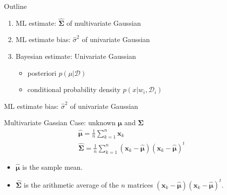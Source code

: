 \documentclass[compress,blue]{beamer}
\newcommand{\bx}{\mathbf{x}}
\newcommand{\bmu}{\mathbf{\mu}}
\newcommand{\bSig}{\mathbf{\Sigma}}
\newcommand{\calD}{\mathcal{D}}
\begin{document}
\begin{frame}{Outline}
	\begin{enumerate}
		\item<1-> ML estimate: $\hat{\bSig}$ of multivariate Gaussian 
		\vspace{0.1in}
		\item<2-> ML estimate bias: $\hat{\sigma}^2$ of univariate Gaussian
		\vspace{0.1in}
		\item<0> Bayesian estimate: Univariate Gaussian
		\begin{itemize}
			\item posteriori $p(\mu|\calD)$
			\item conditional probability density $p(x | w_i, \calD_i)$
		\end{itemize}
	\end{enumerate}
\end{frame}

\begin{frame}{ML estimate bias: $\hat{\sigma}^2$ of univariate Gaussian}
	\begin{block}{Multivariate Gassian Case: unknown $\bmu$ and $\bSig$}
		\begin{align}
			&\hat{\bmu} = \frac{1}{n}\sum_{k=1}^n\bx_k\\
			&\hat{\bSig} = \frac{1}{n}\sum_{k=1}^n(\bx_k - \hat{\bmu})(\bx_k - \hat{\bmu})^t
		\end{align}
		\small
		\begin{itemize}
			\item $\hat{\bmu}$ is the sample mean. 
			\item $\hat{\bSig}$ is the arithmetic average of the $n$ matrices $(\bx_k - \hat{\bmu})(\bx_k - \hat{\bmu})^t$.
		\end{itemize}
		\normalsize
	\end{block}	
\end{frame}
\end{document}

